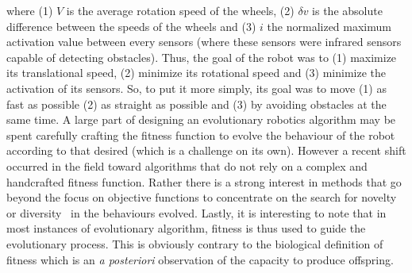     where (1) $V$ is the average rotation speed of the wheels, (2) $\delta v$ is the absolute difference between the speeds of the wheels and (3) $i$ the normalized maximum activation value between every sensors (where these sensors were infrared sensors capable of detecting obstacles). Thus, the goal of the robot was to (1) maximize its translational speed, (2) minimize its rotational speed and (3) minimize the activation of its sensors. So, to put it more simply, its goal was to move (1) as fast as possible (2) as straight as possible and (3) by avoiding obstacles at the same time. A large part of designing an evolutionary robotics algorithm may be spent carefully crafting the fitness function to evolve the behaviour of the robot according to that desired (which is a challenge on its own). However a recent shift occurred in the field toward algorithms that do not rely on a complex and handcrafted fitness function. Rather there is a strong interest in methods that go beyond the focus on objective functions to concentrate on the search for novelty~\parencite{Lehman2008, Lehman2011} or diversity~\parencite{Mouret2012a} in the behaviours evolved. Lastly, it is interesting to note that in most instances of evolutionary algorithm, fitness is thus used to guide the evolutionary process. This is obviously contrary to the biological definition of fitness which is an \emph{a posteriori} observation of the capacity to produce offspring. 


